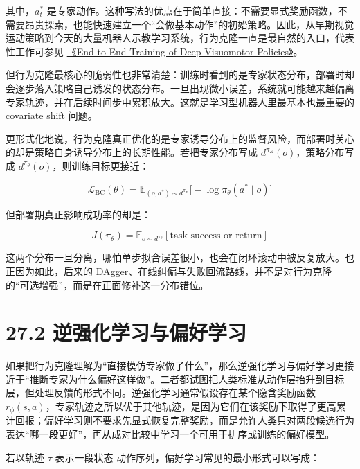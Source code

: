 其中，\(a_t^\ast\) 是专家动作。这种写法的优点在于简单直接：不需要显式奖励函数，不需要昂贵探索，也能快速建立一个“会做基本动作”的初始策略。因此，从早期视觉运动策略到今天的大量机器人示教学习系统，行为克隆一直是最自然的入口，代表性工作可参见 \href{https://arxiv.org/abs/1504.00702}{《End-to-End Training of Deep Visuomotor Policies》}。

但行为克隆最核心的脆弱性也非常清楚：训练时看到的是专家状态分布，部署时却会逐步落入策略自己诱发的状态分布。一旦出现微小误差，系统就可能越来越偏离专家轨迹，并在后续时间步中累积放大。这就是学习型机器人里最基本也最重要的 covariate shift 问题。

更形式化地说，行为克隆真正优化的是专家诱导分布上的监督风险，而部署时关心的却是策略自身诱导分布上的长期性能。若把专家分布写成 \(d^{\pi_E}(o)\)，策略分布写成 \(d^{\pi_\theta}(o)\)，则训练目标更接近：

\begingroup
\scriptsize
\begin{equation*}
\mathcal{L}_{\mathrm{BC}}(\theta)=\mathbb{E}_{(o,a^\ast)\sim d^{\pi_E}}\bigl[-\log \pi_\theta(a^\ast \mid o)\bigr]
\end{equation*}
\endgroup

但部署期真正影响成功率的却是：

\begingroup
\footnotesize
\begin{equation*}
J(\pi_\theta)=\mathbb{E}_{o\sim d^{\pi_\theta}}[\text{task success or return}]
\end{equation*}
\endgroup

这两个分布一旦分离，哪怕单步拟合误差很小，也会在闭环滚动中被反复放大。也正因为如此，后来的 DAgger、在线纠偏与失败回流路线，并不是对行为克隆的“可选增强”，而是在正面修补这一分布错位。

\section*{27.2 逆强化学习与偏好学习}


如果把行为克隆理解为“直接模仿专家做了什么”，那么逆强化学习与偏好学习更接近于“推断专家为什么偏好这样做”。二者都试图把人类标准从动作层抬升到目标层，但处理反馈的形式不同。逆强化学习通常假设存在某个隐含奖励函数 \(r_\phi(s, a)\)，专家轨迹之所以优于其他轨迹，是因为它们在该奖励下取得了更高累计回报；偏好学习则不要求先显式恢复完整奖励，而是允许人类只对两段候选行为表达“哪一段更好”，再从成对比较中学习一个可用于排序或训练的偏好模型。

若以轨迹 \(\tau\) 表示一段状态-动作序列，偏好学习常见的最小形式可以写成：

